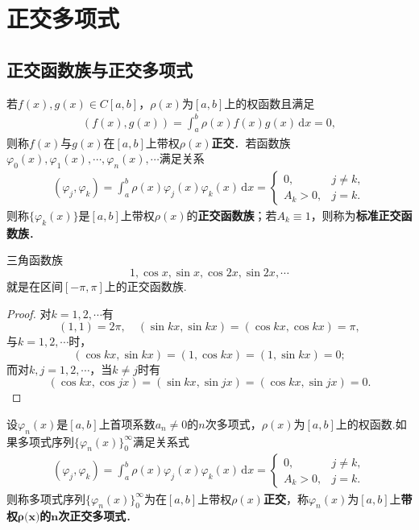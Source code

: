 \documentclass[../../main.tex]{subfiles}
\begin{document}
\section{正交多项式}

\subsection{正交函数族与正交多项式}

\begin{definition}
若\( f(x),g(x) \in C[a,b] \)，\(\rho(x)\)为\([a,b]\)上的权函数且满足
\begin{align}
(f(x),g(x)) = \int_a^b \rho(x) f(x) g(x) \, \mathrm{d}x = 0, \label{2.1}
\end{align}
则称\( f(x) \)与\( g(x) \)在\([a,b]\)上带权\(\rho(x)\)\textbf{正交}．若函数族\(\varphi_0(x),\varphi_1(x),\cdots,\varphi_n(x),\cdots\)满足关系
\begin{align}
(\varphi_j,\varphi_k) = \int_a^b \rho(x)\varphi_j(x)\varphi_k(x) \, \mathrm{d}x = \begin{cases}
0, & j \neq k, \\
A_k > 0, & j = k.
\end{cases} \label{2.2}
\end{align}
则称\(\{\varphi_k(x)\}\)是\([a,b]\)上带权\(\rho(x)\)的\textbf{正交函数族}；若\( A_k \equiv 1 \)，则称为\textbf{标准正交函数族}．
\end{definition}

\begin{example}
三角函数族
\[
1,\cos x,\sin x,\cos 2x,\sin 2x,\cdots
\]
就是在区间\([-\pi,\pi]\)上的正交函数族.
\end{example}
\begin{proof}
对\( k=1,2,\cdots \)有
\[
(1,1) = 2\pi, \quad (\sin kx,\sin kx) = (\cos kx,\cos kx) = \pi,
\]
与\( k=1,2,\cdots \)时，
\[
(\cos kx,\sin kx) = (1,\cos kx) = (1,\sin kx) = 0;
\]
而对\( k,j=1,2,\cdots \)，当\( k \neq j \)时有
\[
(\cos kx,\cos jx) = (\sin kx,\sin jx) = (\cos kx,\sin jx) = 0.
\]

\end{proof}

\begin{definition}
设$\varphi_n(x)$是$[a,b]$上首项系数$a_n \neq 0$的$n$次多项式，$\rho(x)$为$[a,b]$上的权函数.如果多项式序列$\{\varphi_n(x)\}_{0}^{\infty}$满足关系式
\begin{align*}
(\varphi_j,\varphi_k) = \int_a^b \rho(x)\varphi_j(x)\varphi_k(x) \, \mathrm{d}x = \begin{cases}
0, & j \neq k, \\
A_k > 0, & j = k.
\end{cases}
\end{align*}
则称多项式序列$\{\varphi_n(x)\}_{0}^{\infty}$为在$[a,b]$上带权$\rho(x)$\textbf{正交}，称$\varphi_n(x)$为$[a,b]$上\textbf{带权$\boldsymbol{\rho }\mathbf{(}\boldsymbol{x}\mathbf{)}$的$\boldsymbol{n}$次正交多项式}．
\end{definition}
\end{document}
